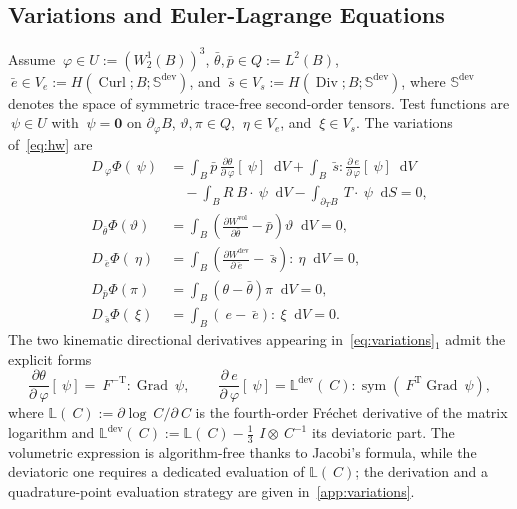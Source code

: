 \documentclass[12pt]{article}
\newcommand{\F}{~F}
\newcommand{\C}{~C}
\newcommand{\edev}{~e}
\newcommand{\ebar}{\bar{~e}}
\newcommand{\sbar}{\bar{~s}}
\newcommand{\thbar}{\bar{\theta}}
\newcommand{\pbar}{\bar{p}}
\newcommand{\supvol}{^{\mathrm{vol}}}
\newcommand{\supdev}{^{\mathrm{dev}}}
\newcommand{\Symsd}{\mathbb{S}\supdev}
\DeclareMathOperator{\Div}{Div}
\DeclareMathOperator{\Grad}{Grad}
\DeclareMathOperator{\Curl}{Curl}
\DeclareMathOperator{\sym}{sym}
\newcommand*\diff{\mathop{}\!\mathrm{d}}
\newcommand{\transpose}[1]{{#1}^{\mathrm{T}}}
\begin{document}
\subsection{Variations and Euler-Lagrange Equations}
\label{sec:variations}

Assume $~\varphi \in U := (W^1_2(B))^3$,
$\thbar, \pbar \in Q := L^2(B)$,
$\ebar \in V_e := H(\Curl; B; \Symsd)$, and
$\sbar \in V_s := H(\Div; B; \Symsd)$, where $\Symsd$ denotes the space
of symmetric trace-free second-order tensors. Test functions are
$~\psi \in U$ with $~\psi = \mathbf{0}$ on
$\partial_\varphi B$, $\vartheta, \pi \in Q$, $~\eta \in V_e$, and
$~\xi \in V_s$. The variations of~\eqref{eq:hw} are
\begin{equation}
  \label{eq:variations}
  \begin{split}
    D_{~\varphi}\Phi(~\psi)
    & =
    \int_B \pbar \, \frac{\partial \theta}{\partial ~\varphi}[~\psi] \diff V
    +
    \int_B \sbar : \frac{\partial \edev}{\partial ~\varphi}[~\psi] \diff V
    \\
    & \quad
    -
    \int_B R ~B \cdot ~\psi \diff V
    -
    \int_{\partial_T B} ~T \cdot ~\psi \diff S
    = 0,
    \\
    D_{\thbar}\Phi(\vartheta)
    & =
    \int_B \left( \frac{\partial W\supvol}{\partial \thbar} - \pbar \right) \vartheta \diff V
    = 0,
    \\
    D_{\ebar}\Phi(~\eta)
    & =
    \int_B \left( \frac{\partial W\supdev}{\partial \ebar} - \sbar \right) : ~\eta \diff V
    = 0,
    \\
    D_{\pbar}\Phi(\pi)
    & =
    \int_B \left( \theta - \thbar \right) \pi \diff V
    = 0,
    \\
    D_{\sbar}\Phi(~\xi)
    & =
    \int_B \left( \edev - \ebar \right) : ~\xi \diff V
    = 0.
  \end{split}
\end{equation}
The two kinematic directional derivatives appearing
in~\eqref{eq:variations}$_1$ admit the explicit forms
\begin{equation}
  \label{eq:kinematic-derivatives}
  \frac{\partial \theta}{\partial ~\varphi}[~\psi]
  =
  \F^{-\mathrm{T}} : \Grad ~\psi,
  \qquad
  \frac{\partial \edev}{\partial ~\varphi}[~\psi]
  =
  \mathbb{L}\supdev(\C) : \sym\!\left(\transpose{\F}\Grad ~\psi\right),
\end{equation}
where $\mathbb{L}(\C) := \partial \log \C / \partial \C$ is the
fourth-order Fr\'echet derivative of the matrix logarithm and
$\mathbb{L}\supdev(\C) := \mathbb{L}(\C) - \tfrac{1}{3}\, ~I \otimes \C^{-1}$
its deviatoric part. The volumetric expression is algorithm-free
thanks to Jacobi's formula, while the deviatoric one requires a
dedicated evaluation of $\mathbb{L}(\C)$; the derivation and a
quadrature-point evaluation strategy are given
in~\ref{app:variations}.
\end{document}
